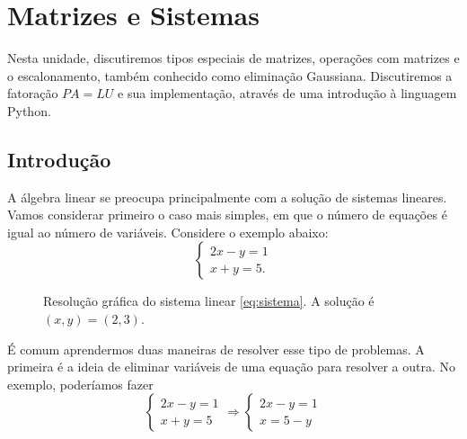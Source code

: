 \chapter{Matrizes e Sistemas}

Nesta unidade, discutiremos tipos especiais de matrizes, operações com matrizes e o escalonamento, também conhecido como eliminação Gaussiana. Discutiremos a fatoração $PA=LU$ e sua implementação, através de uma introdução à linguagem Python.

\section{Introdução}

A álgebra linear se preocupa principalmente com a solução de sistemas lineares. Vamos considerar primeiro o caso mais simples, em que o número de equações é igual ao número de variáveis. Considere o exemplo abaixo:
\begin{equation}
  \label{eq:sistema}
  \begin{cases}
    2x-y = 1\\
    x+y = 5.
  \end{cases}
\end{equation}
\begin{figure}[h!]
  \begin{center}
    \caption{\label{fig:sistemalinear} Resolução gráfica do sistema linear \eqref{eq:sistema}. A solução é $(x,y) = (2,3)$.}
  \end{center}
\end{figure}
É comum aprendermos duas maneiras de resolver esse tipo de problemas. A primeira é a ideia de eliminar variáveis de uma equação para resolver a outra. No exemplo, poderíamos fazer
\begin{equation*}
    \begin{cases}
        2x-y = 1\\
        x+y = 5
    \end{cases}
    \Rightarrow
    \begin{cases}
        2x-y = 1\\
        x=5-y
    \end{cases}
\end{equation*}

